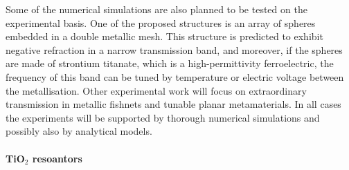 Some of the numerical simulations are also planned to be tested on the experimental basis. One of the proposed structures is an array of spheres embedded in a double metallic mesh. This structure is predicted to exhibit negative refraction in a narrow transmission band, and moreover, if the spheres are made of strontium titanate, which is a high-permittivity ferroelectric, the frequency of this band can be tuned by temperature or electric voltage between the metallisation. Other experimental work will focus on extraordinary transmission in metallic fishnets and tunable planar metamaterials. In all cases the experiments will be supported by thorough numerical simulations and possibly also by analytical models.


\paragraph{TiO$_{2}$ resoantors}





